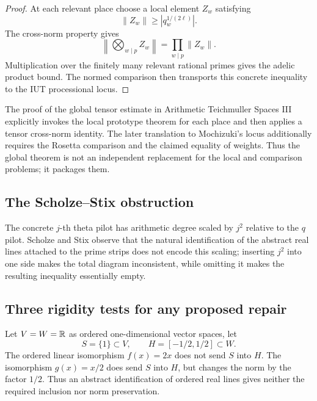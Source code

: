 \begin{proof}
At each relevant place choose a local element $Z_w$ satisfying
\[
 \|Z_w\|\ge |q_w^{1/(2\ell)}|.
\]
The cross-norm property gives
\[
 \left\|\bigotimes_{w\mid p}Z_w\right\|
 =\prod_{w\mid p}\|Z_w\|.
\]
Multiplication over the finitely many relevant rational primes gives the adelic product bound.  The normed comparison then transports this concrete inequality to the IUT processional locus.
\end{proof}

\begin{audit}
The proof of the global tensor estimate in Arithmetic Teichmuller Spaces III explicitly invokes the local prototype theorem for each place and then applies a tensor cross-norm identity.  The later translation to Mochizuki's locus additionally requires the Rosetta comparison and the claimed equality of weights.  Thus the global theorem is not an independent replacement for the local and comparison problems; it packages them.
\end{audit}

\subsection{The Scholze--Stix obstruction}

The concrete $j$-th theta pilot has arithmetic degree scaled by $j^2$ relative to the $q$ pilot.  Scholze and Stix observe that the natural identification of the abstract real lines attached to the prime strips does not encode this scaling; inserting $j^2$ into one side makes the total diagram inconsistent, while omitting it makes the resulting inequality essentially empty.

\subsection{Three rigidity tests for any proposed repair}

\begin{counterexample}\label{cex:abstract-scaling}
Let $V=W=\mathbb R$ as ordered one-dimensional vector spaces, let
\[
 S=\{1\}\subset V,\qquad H=[-1/2,1/2]\subset W.
\]
The ordered linear isomorphism $f(x)=2x$ does not send $S$ into $H$.  The
isomorphism $g(x)=x/2$ does send $S$ into $H$, but changes the norm by the
factor $1/2$.  Thus an abstract identification of ordered real lines gives
neither the required inclusion nor norm preservation.
\end{counterexample}

